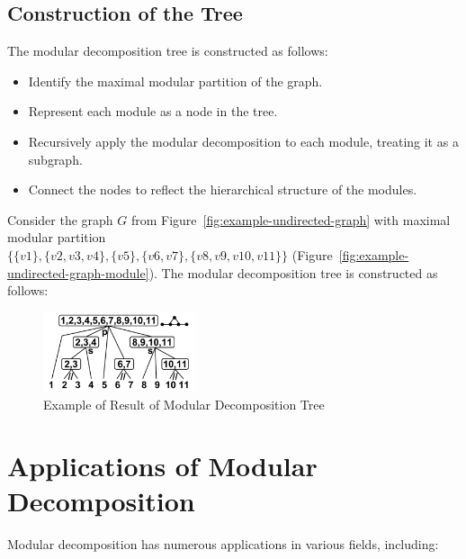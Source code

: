 \subsection*{Construction of the Tree}\label{subsec:construction-of-the-tree}

The modular decomposition tree is constructed as follows:

\begin{itemize}
    \item Identify the maximal modular partition of the graph.
    \item Represent each module as a node in the tree.
    \item Recursively apply the modular decomposition to each module, treating it as a subgraph.
    \item Connect the nodes to reflect the hierarchical structure of the modules.
\end{itemize}


\begin{Example}
    Consider the graph $G$ from Figure~\ref{fig:example-undirected-graph} with maximal modular partition \\ $\{\{v1\}, \{v2, v3, v4\}, \{v5\}, \{v6, v7\}, \{v8, v9, v10, v11\}\}$ (Figure~\ref{fig:example-undirected-graph-module}).
    The modular decomposition tree is constructed as follows:

    \begin{figure}[!h]
        \centering
        \includegraphics[width=0.40\textwidth]{images/graphs/undirected_graph_wikipedia_modular_decomposition}
        \caption{Example of Result of Modular Decomposition Tree}
        \label{fig:example-undirected-graph-modular-decomposition-tree}
    \end{figure}
\end{Example}


\section{Applications of Modular Decomposition}\label{sec:applications-of-modular-decomposition}

Modular decomposition has numerous applications in various fields, including:

